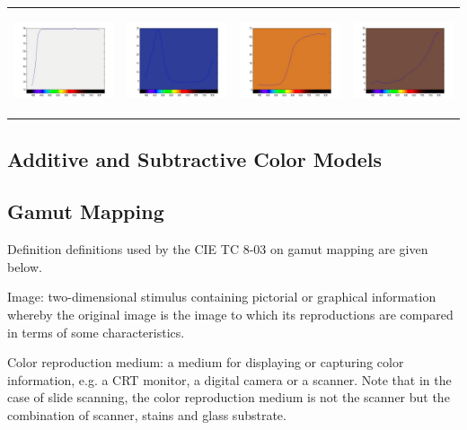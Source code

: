 \begin{tabular}{  c c c c }
\includegraphics[width=3.0cm,height=3.0cm]{ColorPaper/ch21.jpg}
&
\includegraphics[width=3.0cm,height=3.0cm]{ColorPaper/ch22.jpg}
&
\includegraphics[width=3.0cm,height=3.0cm]{ColorPaper/ch23.jpg}
&
\includegraphics[width=3.0cm,height=3.0cm]{ColorPaper/ch24.jpg}
\end{tabular}

\subsection{Additive and Subtractive Color Models}

\subsection{Gamut Mapping}
Definition definitions used by the CIE TC 8-03 on gamut mapping are given below.

Image: two-dimensional stimulus containing pictorial or graphical information whereby the original image is the image to which its reproductions are compared in terms of some characteristics.

Color reproduction medium: a medium for displaying or capturing color information, e.g. a CRT
monitor, a digital camera or a scanner. Note that in the case of slide scanning, the color reproduction medium is not the scanner but the combination of scanner, stains and glass substrate.

